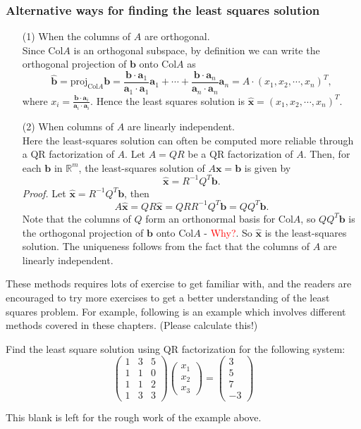\documentclass[10pt, a4paper]{article}
\newcommand{\R}{\mathbb{R}}
\newcommand{\vt}[1]{\mathbf{#1}}
\begin{document}
\subsubsection*{Alternative ways for finding the least squares solution}
\begin{itemize}
    \item[(1)] When the columns of $A$ are orthogonal.\\
    Since Col$A$ is an orthogonal subspace, by definition we can write the orthogonal projection of $\vt{b}$ onto Col$A$ as\[
    \hat{\vt{b}} = \text{proj}_{\text{Col}A}\vt{b} = \frac{\vt{b}\cdot\vt{a}_1}{\vt{a}_1\cdot\vt{a}_1}\vt{a}_1 + \cdots + \frac{\vt{b}\cdot\vt{a}_n}{\vt{a}_n\cdot\vt{a}_n}\vt{a}_n = A\cdot (x_1, x_2, \cdots, x_n)^T,
    \]
    where $x_i=\frac{\vt{b}\cdot\vt{a}_i}{\vt{a}_i\cdot\vt{a}_i}$. Hence the least squares solution is $\hat{\vt{x}}=(x_1, x_2, \cdots, x_n)^T$.
    \item[(2)] When columns of $A$ are linearly independent.\\
    Here the least-squares solution can often be computed more reliable through a QR factorization of $A$. Let $A=QR$ be a QR factorization of $A$.
    Then, for each $\vt{b}$ in $\R^m$, the least-squares solution of $A\vt{x}=\vt{b}$ is given by\[
    \hat{\vt{x}} = R^{-1}Q^T\vt{b}.
    \]
    \indent\textit{Proof.} Let $\hat{\vt{x}}=R^{-1}Q^T\vt{b}$, then\[
    A\hat{\vt{x}}=QR\hat{\vt{x}}=QRR^{-1}Q^T\vt{b}=QQ^T\vt{b}.
    \]
    Note that the columns of $Q$ form an orthonormal basis for Col$A$, so $QQ^T\vt{b}$ is the orthogonal projection of $\vt{b}$ onto Col$A$ - \textcolor{red}{Why?}. So $\hat{\vt{x}}$ is the least-squares solution. The uniqueness follows from the fact that the columns of $A$ are linearly independent.
\end{itemize}

\indent These methods requires lots of exercise to get familiar with, and the readers are encouraged to try more exercises to get a better understanding of the least squares problem. For example, following is an example which involves different methods covered in these chapters. (Please calculate this!)
\begin{example}
    Find the least square solution using QR factorization for the following system:\[
    \begin{pmatrix}
        1&3&5\\1&1&0\\1&1&2\\1&3&3
    \end{pmatrix}\begin{pmatrix}
        x_1\\x_2\\x_3
    \end{pmatrix}=\begin{pmatrix}
        3\\5\\7\\-3
    \end{pmatrix}
    \]
\end{example}
This blank is left for the rough work of the example above.\\
\newpage
\end{document}
